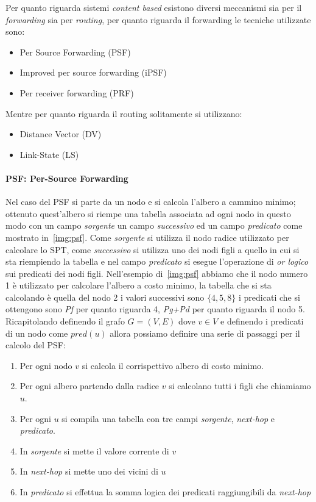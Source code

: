 Per quanto riguarda sistemi \emph{content based} esistono diversi meccanismi sia per il \emph{forwarding} sia per \emph{routing}, per quanto riguarda il forwarding le tecniche utilizzate sono:
\begin{itemize}
\item Per Source Forwarding (PSF)
\item Improved per source forwarding (iPSF)
\item Per receiver forwarding (PRF)
\end{itemize}
Mentre per quanto riguarda il routing solitamente si utilizzano:
\begin{itemize}
\item Distance Vector (DV)
\item Link-State (LS)
\end{itemize}
\paragraph{PSF: Per-Source Forwarding}
Nel caso del PSF si parte da un nodo e si calcola l'albero a cammino minimo; ottenuto quest'albero si riempe una tabella associata ad ogni nodo in questo modo con un campo \emph{sorgente} un campo \emph{successivo} ed un campo \emph{predicato} come mostrato in \figurename\,\ref{img:psf}.
Come \emph{sorgente} si utilizza il nodo radice utilizzato per calcolare lo SPT, come \emph{successivo} si utilizza uno dei nodi figli a quello in cui si sta riempiendo la tabella e nel campo \emph{predicato} si esegue l'operazione di \emph{or logico} sui predicati dei nodi figli.
Nell'esempio di \figurename\,\ref{img:psf} abbiamo che il nodo numero 1 è utilizzato per calcolare l'albero a costo minimo, la tabella che si sta calcolando è quella del nodo 2 i valori successivi sono $\{4,5,8\}$ i predicati che si ottengono sono \emph{Pf} per quanto riguarda 4, \emph{Pg+Pd} per quanto riguarda il nodo 5.
Ricapitolando definendo il grafo $G = (V,E)$ dove $v \in V$ e definendo i predicati di un nodo come $pred(u)$ allora possiamo definire una serie di passaggi per il calcolo del PSF:
\begin{enumerate}
\item Per ogni nodo $v$ si calcola il corrispettivo albero di costo minimo.
\item Per ogni albero partendo dalla radice $v$ si calcolano tutti i figli che chiamiamo $u$.
\item Per ogni $u$ si compila una tabella con tre campi \emph{sorgente}, \emph{next-hop} e \emph{predicato}.
\item In \emph{sorgente} si mette il valore corrente di $v$
\item In \emph{next-hop} si mette uno dei vicini di $u$
\item In \emph{predicato} si effettua la somma logica dei predicati raggiungibili da \emph{next-hop}
\end{enumerate}
